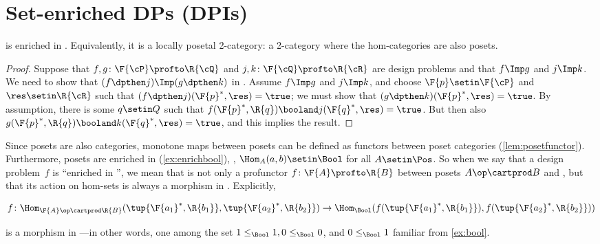 
\section{Set-enriched DPs (DPIs)}

\begin{proposition}
    \label{prop:DP_loc_pos}
    \DP is enriched in \Pos.
    Equivalently, it is a locally posetal 2-category: a 2-category where the hom-categories are also posets.
\end{proposition}
\begin{proof}
    Suppose that $f,g\colon \F{\cP} \profto \R{\cQ}$ and $j,k\colon \F{\cQ} \profto \R{\cR}$ are design problems and that $f\Imp g$ and $j\Imp k$.
    We need to show that $(f\dpthen j)\Imp(g\dpthen k)$ in \DP.
    Assume $f\Imp g$ and $j\Imp k$, and choose $\F{p}\setin\F{\cP} $ and $\res\setin\R{\cR}$ such that $(f\dpthen j)(\F{p}^*,\res)=\true$; we must show that $(g \dpthen k)(\F{p}^*,\res)=\true$.
    By assumption, there is some $q\setin Q$ such that $f(\F{p}^*,\R{q})\booland j(\F{q}^*,\res)=\true$.
    But then also $g(\F{p}^*,\R{q})\booland k(\F{q}^*,\res)=\true$, and this implies the result.
\end{proof}
Since posets are also categories, monotone maps between posets can be defined as functors between poset categories (\cref{lem:posetfunctor}).
Furthermore, posets are enriched in \Bool (\cref{ex:enrichbool}), \ie, $\Hom_A(a,b) \setin \Bool$ for all $A \setin \Pos$.
So when we say that a design problem~$f$ is ``enriched in \Bool'', we mean that is not only a profunctor $f \colon \F{A} \profto \R{B}$ between posets $A\op \cartprod B$ and \Bool, but that its action on hom-sets is always a morphism in \Bool.
Explicitly,

\begin{widepar}
    \begin{equation}
        f \colon \Hom_{\F{A}\op \cartprod \R{B}}(\tup{\F{a_1}^*,\R{b_1}}, \tup{\F{a_2}^*,\R{b_2}}) \to \Hom_\Bool(f(\tup{\F{a_1}^*,\R{b_1}}), f(\tup{\F{a_2}^*,\R{b_2}}))
    \end{equation}
\end{widepar}
is a morphism in \Bool---in other words, one among the set $1 \leq_\Bool 1, 0 \leq_\Bool 0$, and $0 \leq_\Bool 1$ familiar from \cref{ex:bool}.

